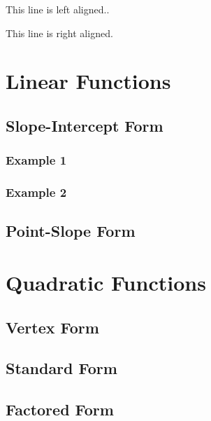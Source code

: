 \documentclass[11pt]{article}
\begin{document}
\begin{flushleft} %
    This line is left aligned..
\end{flushleft}


\begin{flushright} %
    This line is right aligned.
\end{flushright}


\vspace{1cm}








\section{Linear Functions} %
    \subsection{Slope-Intercept Form}
        \subsubsection{Example 1}
        \subsubsection{Example 2}
    \subsection{Point-Slope Form}
\section{Quadratic Functions}
    \subsection{Vertex Form}
    \subsection{Standard Form}
    \subsection{Factored Form}
\end{document}

